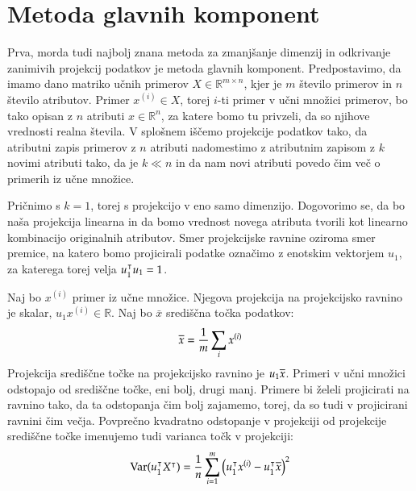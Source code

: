 \begin{figure}[htbp]
\end{figure}

\section{Metoda glavnih komponent}

Prva, morda tudi najbolj znana metoda za zmanjšanje dimenzij in odkrivanje zanimivih projekcij podatkov je metoda glavnih komponent. Predpostavimo, da imamo dano matriko učnih primerov $X\in\mathbb{R}^{m\times n}$, kjer je $m$ število primerov in $n$ število atributov. Primer $x^{(i)}\in X$, torej $i$-ti primer v učni množici primerov, bo tako opisan z $n$ atributi $x\in\mathbb{R}^{n}$, za katere bomo tu privzeli, da so njihove vrednosti realna števila. V splošnem iščemo projekcije podatkov tako, da atributni zapis primerov z $n$ atributi nadomestimo z atributnim zapisom z $k$ novimi atributi tako, da je $k\ll n$ in da nam novi atributi povedo čim več o primerih iz učne množice.

Pričnimo s $k=1$, torej s projekcijo v eno samo dimenzijo. Dogovorimo se, da bo naša projekcija linearna in da bomo vrednost novega atributa tvorili kot linearno kombinacijo originalnih atributov. Smer projekcijske ravnine oziroma smer premice, na katero bomo projicirali podatke označimo z enotskim vektorjem $u_1$, za katerega torej velja $u_1^\intercal u_1=1$.

Naj bo $x^{(i)}$ primer iz učne množice. Njegova projekcija na projekcijsko ravnino je skalar, $u_1 x^{(i)}\in \mathbb{R}$. Naj bo $\bar{x}$ središčna točka podatkov:
%
$$ \overline{x}=\frac{1}{m}\sum_i x^{(i)}$$
%
Projekcija središčne točke na projekcijsko ravnino je $u_1 \overline{x}$. Primeri v učni množici odstopajo od središčne točke, eni bolj, drugi manj. Primere bi želeli projicirati na ravnino tako, da ta odstopanja čim bolj zajamemo, torej, da so tudi v projicirani ravnini čim večja. Povprečno kvadratno odstopanje v projekciji od projekcije središčne točke imenujemo tudi varianca točk v projekciji:
%
$$ \mathrm{Var}(u_1^\intercal X^\intercal)=\frac{1}{n}\sum_{i=1}^m \big(u_1^\intercal x^{(i)}-u_1^\intercal\overline{x}\big)^2 $$

